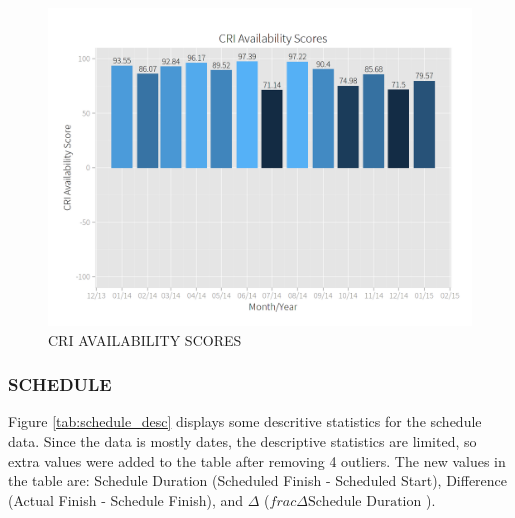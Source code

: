 \documentclass[SDSUThesis.tex]{subfiles}
\begin{document}
            \begin{figure}[ht]
                \centering
                \includegraphics[scale=.3]{images/availability_scores.png}
                \caption{CRI AVAILABILITY SCORES}
                \label{fig:availability-scores}
            \end{figure}
            
        \subsubsection{SCHEDULE}
            Figure \ref{tab:schedule_desc} displays some descritive statistics
            for the schedule data.  Since the data is mostly dates, the 
            descriptive statistics are limited, so extra values were
            added to the table after removing 4 outliers.  The new values
            in the table are: Schedule Duration (Scheduled Finish - Scheduled Start),
            Difference (Actual Finish - Schedule Finish), and 
            $\Delta$ ($frac{\Delta}{\text{Schedule Duration}}$ ).
        
\end{document}
